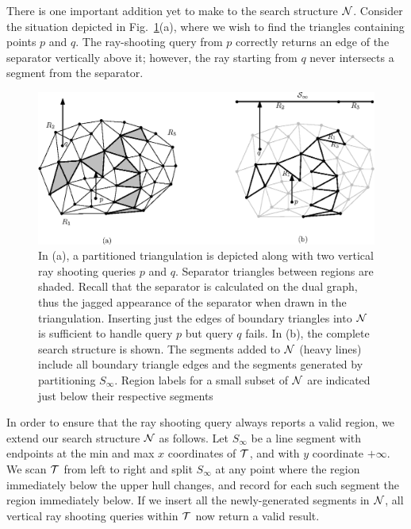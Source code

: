 {There is one important addition yet to make to the search structure $\mathcal{N}$.
Consider the situation depicted in Fig.~\ref{fig:pl_structure}(a), where
we wish to find the triangles containing points $p$ and $q$. 
The ray-shooting query from $p$ correctly returns an edge of the separator
vertically above it; however, the ray starting from $q$ never intersects a 
segment from the separator.

\begin{figure}
  \includegraphics[width=\textwidth]{Fig5}
  \caption[Point location by vertical ray shooting]{In (a), a 
    partitioned triangulation is depicted along with two vertical
    ray shooting queries $p$ and $q$.
    Separator triangles between regions are shaded.
    Recall that the separator is calculated on the dual graph, thus
    the jagged appearance of the separator when drawn in the 
    triangulation.
    Inserting just the edges of boundary triangles into $\mathcal{N}$ is 
    sufficient to handle query $p$ but query $q$ fails.
    In (b), the complete search structure is shown.
    The segments added to $\mathcal{N}$ (heavy lines) 
    include all boundary triangle edges and the segments generated
    by partitioning $S_{\infty}$.
    Region labels for a small subset of $\mathcal{N}$ are indicated just below
    their respective segments
  }
  \label{fig:pl_structure}
\end{figure}
              
In order to ensure that the ray shooting query always reports a valid region, we 
extend our search structure $\mathcal{N}$ as follows.
Let $S_{\infty}$ be a line segment with endpoints at the min and max 
$x$ coordinates of $\mathcal{T}$, and with $y$ coordinate $+\infty$.
We scan $\mathcal{T}$ from left to right and split $S_{\infty}$ at any
point where the region immediately below the upper hull changes,
and record for each such segment the region immediately below.
If we insert all the newly-generated segments in $\mathcal{N}$, all vertical ray 
shooting queries within $\mathcal{T}$ now return a valid result.

}
